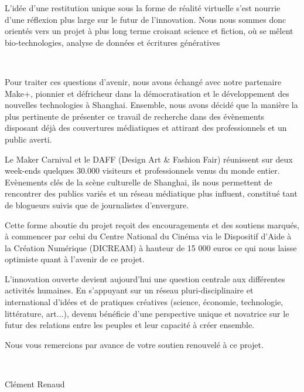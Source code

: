 L{\textquoteright}id\'ee d{\textquoteright}une restitution unique sous
la forme de r\'ealit\'e virtuelle s{\textquoteright}est nourrie
d{\textquoteright}une r\'eflexion plus large sur le futur de
l{\textquoteright}innovation. Nous nous sommes donc orient\'es vers un
projet \`a plus long terme croisant science et fiction, o\`u se
m\^elent bio-technologies, analyse de donn\'ees et \'ecritures
g\'en\'eratives~

~

Pour traiter ces questions d{\textquoteright}avenir, nous avons
\'echang\'e avec notre partenaire Make+, pionnier et d\'efricheur dans
la d\'emocratisation et le d\'eveloppement des nouvelles technologies
\`a Shanghai. Ensemble, nous avons d\'ecid\'e que la mani\`ere la plus
pertinente de pr\'esenter ce travail de recherche dans des
\'ev\`enements disposant d\'ej\`a des couvertures m\'ediatiques et
attirant des professionnels et un public averti.

Le Maker Carnival et le DAFF (Design Art \& Fashion Fair) r\'eunissent
sur deux week-ends quelques 30.000 visiteurs et professionnels venus du
monde entier. Ev\`enements cl\'es de la sc\`ene culturelle de Shanghai,
ils nous permettent de rencontrer des publics vari\'es et un r\'eseau
m\'ediatique plus influent, constitu\'e tant de blogueurs suivis que de
journalistes d{\textquoteright}envergure.

Cette forme aboutie du projet re\c{c}oit des encouragements et des
soutiens marqu\'es, \`a commencer par celui du Centre National du
Cin\'ema via le Dispositif d{\textquoteright}Aide \`a la Cr\'eation
Num\'erique (DICREAM) \`a hauteur de 15 000 euros ce qui nous laisse
optimiste quant \`a l{\textquoteright}avenir de ce projet.

L{\textquoteright}innovation ouverte devient aujourd{\textquoteright}hui
une question centrale aux diff\'erentes activit\'es humaines. En
s{\textquoteright}appuyant sur un r\'eseau pluri-disciplinaire et
international d{\textquoteright}id\'ees et de pratiques cr\'eatives
(science, \'economie, technologie, litt\'erature, art...),
devenu 
b\'en\'eficie d{\textquoteright}une perspective unique et novatrice sur
le futur des relations entre les peuples et leur capacit\'e \`a cr\'eer
ensemble.


\bigskip

Nous vous remercions par avance de votre soutien renouvel\'e \`a ce
projet.

~

Cl\'ement Renaud

